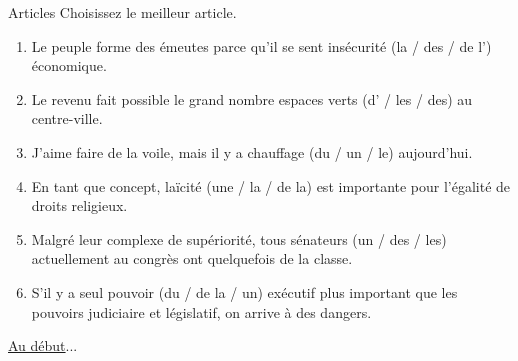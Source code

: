 \begin{frame}{Articles}
  \small
  Choisissez le meilleur article.
  \begin{enumerate}
    \item Le peuple forme des émeutes parce qu'il se sent \underline{} insécurité (la / des / de l') économique.
    \item Le revenu fait possible le grand nombre \underline{} espaces verts (d' / les / des) au centre-ville.
    \item J'aime faire de la voile, mais il y a \underline{} chauffage (du / un / le) aujourd'hui.
    \item En tant que concept, \underline{} laïcité (une / la / de la) est importante pour l'égalité de droits religieux.
    \item Malgré leur complexe de supériorité, tous \underline{} sénateurs (un / des / les) actuellement au congrès ont quelquefois de la classe.
    \item S'il y a \underline{} seul pouvoir (du / de la / un) exécutif plus important que les pouvoirs judiciaire et législatif, on arrive à des dangers.
  \end{enumerate}
  \raggedleft\raggedleft\hyperlink{début}{Au début}...
\end{frame}
